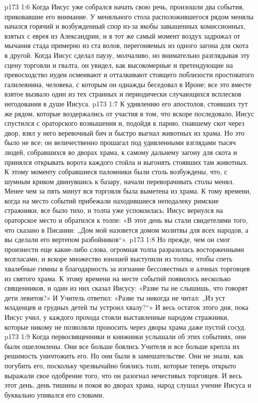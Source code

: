 \vs p173 1:6 Когда Иисус уже собрался начать свою речь, произошли два события, приковавшие его внимание. У меняльного стола расположившегося рядом менялы начался горячий и возбужденный спор из\hyp{}за якобы завышенных комиссионных, взятых с еврея из Александрии, и в тот же самый момент воздух задрожал от мычания стада примерно из ста волов, перегоняемых из одного загона для скота в другой. Когда Иисус сделал паузу, молчаливо, но внимательно разглядывая эту сцену торговли и гвалта, он увидел, как высокомерные и претендующие на превосходство иудеи осмеивают и отталкивают стоящего поблизости простоватого галилеянина, человека, с которым он однажды беседовал в Ироне; все это вместе взятое вызвало один из тех странных и периодически случающихся всплесков негодования в душе Иисуса.
\vs p173 1:7 К удивлению его апостолов, стоявших тут же рядом, которые воздержались от участия в том, что вскоре последовало, Иисус спустился с ораторского возвышения и, подойдя к парню, гнавшему скот через двор, взял у него веревочный бич и быстро выгнал животных из храма. Но это было не все; он величественно прошагал под удивленными взглядами тысяч людей, собравшихся во дворах храма, к самому дальнему загону для скота и принялся открывать ворота каждого стойла и выгонять стоявших там животных. К этому моменту собравшиеся паломники были столь возбуждены, что, с шумным криком двинувшись к базару, начали переворачивать столы менял. Менее чем за пять минут вся торговля была выметена из храма. К тому времени, когда на место событий прибежали находившиеся неподалеку римские стражники, все было тихо, и толпа уже успокоилась; Иисус вернулся на ораторское место и обратился к толпе: «В этот день вы стали свидетелями того, что сказано в Писании: „Дом мой назовется домом молитвы для всех народов, а вы сделали его вертепом разбойников“».
\vs p173 1:8 Но прежде, чем он смог произнести еще какие\hyp{}либо слова, огромная толпа разразилась восторженными возгласами, и вскоре множество юношей выступили из толпы, чтобы спеть хвалебные гимны в благодарность за изгнание бессовестных и алчных торговцев из святого храма. К этому времени на месте событий появилось несколько священников, и один из них сказал Иисусу: «Разве ты не слышишь, что говорят дети левитов?» И Учитель ответил: «Разве ты никогда не читал: „Из уст младенцев и грудных детей ты устроил хвалу?“» И весь остаток этого дня, пока Иисус учил, у каждого прохода стояли выставленные народом стражники, которые никому не позволяли проносить через дворы храма даже пустой сосуд.
\vs p173 1:9 \pc Когда первосвященники и книжники услышали об этих событиях, они были ошеломлены. Они все больше боялись Учителя и все больше крепла их решимость уничтожить его. Но они были в замешательстве. Они не знали, как погубить его, поскольку чрезвычайно боялись толп, которые теперь открыто выражали свое одобрение того, что он разогнал нечестивых торговцев. И весь этот день, день тишины и покоя во дворах храма, народ слушал учение Иисуса и буквально упивался его словами.
